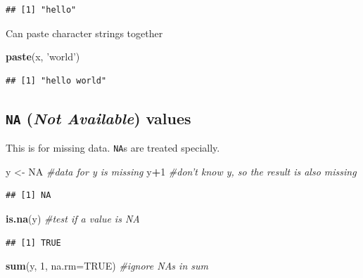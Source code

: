 \documentclass[]{article}
\newenvironment{Shaded}{\begin{snugshade}}{\end{snugshade}}
\newcommand{\KeywordTok}[1]{\textcolor[rgb]{0.13,0.29,0.53}{\textbf{#1}}}
\newcommand{\DataTypeTok}[1]{\textcolor[rgb]{0.13,0.29,0.53}{#1}}
\newcommand{\DecValTok}[1]{\textcolor[rgb]{0.00,0.00,0.81}{#1}}
\newcommand{\StringTok}[1]{\textcolor[rgb]{0.31,0.60,0.02}{#1}}
\newcommand{\CommentTok}[1]{\textcolor[rgb]{0.56,0.35,0.01}{\textit{#1}}}
\newcommand{\OtherTok}[1]{\textcolor[rgb]{0.56,0.35,0.01}{#1}}
\newcommand{\OperatorTok}[1]{\textcolor[rgb]{0.81,0.36,0.00}{\textbf{#1}}}
\newcommand{\NormalTok}[1]{#1}
\begin{document}
\begin{verbatim}
## [1] "hello"
\end{verbatim}

Can paste character strings together

\begin{Shaded}
\begin{Highlighting}[]
\KeywordTok{paste}\NormalTok{(x, }\StringTok{'world'}\NormalTok{)}
\end{Highlighting}
\end{Shaded}

\begin{verbatim}
## [1] "hello world"
\end{verbatim}

\subsection{\texorpdfstring{\texttt{NA} (\emph{Not Available})
values}{NA (Not Available) values}}\label{na-not-available-values}

This is for missing data. \texttt{NA}s are treated specially.

\begin{Shaded}
\begin{Highlighting}[]
\NormalTok{y <-}\StringTok{ }\OtherTok{NA} \CommentTok{#data for y is missing}
\NormalTok{y}\OperatorTok{+}\DecValTok{1} \CommentTok{#don't know y, so the result is also missing}
\end{Highlighting}
\end{Shaded}

\begin{verbatim}
## [1] NA
\end{verbatim}

\begin{Shaded}
\begin{Highlighting}[]
\KeywordTok{is.na}\NormalTok{(y) }\CommentTok{#test if a value is NA}
\end{Highlighting}
\end{Shaded}

\begin{verbatim}
## [1] TRUE
\end{verbatim}

\begin{Shaded}
\begin{Highlighting}[]
\KeywordTok{sum}\NormalTok{(y, }\DecValTok{1}\NormalTok{, }\DataTypeTok{na.rm=}\OtherTok{TRUE}\NormalTok{) }\CommentTok{#ignore NAs in sum}
\end{Highlighting}
\end{Shaded}
\end{document}
